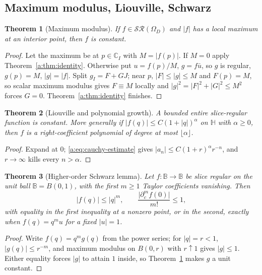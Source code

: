 \documentclass[11pt,a4paper]{article}
\numberwithin{equation}{section}
\newtheorem{theorem}{Theorem}[section]
\theoremstyle{definition}
\theoremstyle{remark}
\theoremstyle{plain}
\newcommand{\HH}{\mathbb H}
\newcommand{\CC}{\mathbb C}
\newcommand{\SR}{\mathcal{SR}}
\newcommand{\Om}{\Omega}
\newcommand{\abs}[1]{\lvert #1\rvert}
\begin{document}
\subsection{Maximum modulus, Liouville, Schwarz}
\label{a:sec:max}

\begin{theorem}[Maximum modulus]
\label{a:thm:max}
If $f\in\SR(\Om_D)$ and $\abs f$ has a local maximum at an interior point,
then $f$ is constant.
\end{theorem}

\begin{proof}
Let the maximum be at $p\in\CC_I$ with $M=\abs{f(p)}$. If $M=0$ apply
Theorem~\ref{a:thm:identity}. Otherwise put $u=f(p)/M$, $g=f\bar u$, so $g$ is
regular, $g(p)=M$, $\abs g=\abs f$. Split $g_I=F+GJ$; near $p$,
$\abs F\le\abs g\le M$ and $F(p)=M$, so scalar maximum modulus gives
$F\equiv M$ locally and $\abs g^2=\abs F^2+\abs G^2\le M^2$ forces $G=0$.
Theorem~\ref{a:thm:identity} finishes.
\end{proof}

\begin{theorem}[Liouville and polynomial growth]
\label{a:thm:liouville-slice}
A bounded entire slice-regular function is constant. More generally if
$\abs{f(q)}\le C(1+\abs q)^\alpha$ on $\HH$ with $\alpha\ge0$, then $f$ is a
right-coefficient polynomial of degree at most $\lfloor\alpha\rfloor$.
\end{theorem}

\begin{proof}
Expand at $0$; \eqref{a:eq:cauchy-estimate} gives
$\abs{a_n}\le C(1+r)^\alpha r^{-n}$, and $r\to\infty$ kills every $n>\alpha$.
\end{proof}

\begin{theorem}[Higher-order Schwarz lemma]
\label{a:thm:schwarz}
Let $f:\mathbb B\to\mathbb B$ be slice regular on the unit ball
$\mathbb B=B(0,1)$, with the first $m\ge1$ Taylor coefficients vanishing.
Then
\begin{equation}
 \abs{f(q)}\le\abs q^m,\qquad \frac{\abs{\partial_c^mf(0)}}{m!}\le1,
 \label{a:eq:schwarz}
\end{equation}
with equality in the first inequality at a nonzero point, or in the second,
exactly when $f(q)=q^mu$ for a fixed $\abs u=1$.
\end{theorem}

\begin{proof}
Write $f(q)=q^mg(q)$ from the power series; for $\abs q=r<1$,
$\abs{g(q)}\le r^{-m}$, and maximum modulus on $B(0,r)$ with $r\uparrow1$
gives $\abs g\le1$. Either equality forces $\abs g$ to attain $1$ inside, so
Theorem~\ref{a:thm:max} makes $g$ a unit constant.
\end{proof}
\end{document}
